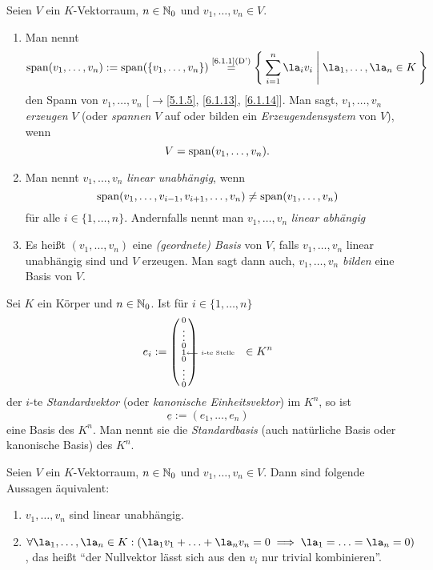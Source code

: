 \documentclass[../../main.tex]{subfiles}
\begin{document}
\begin{df}\label{6.2.1}
Seien $V$ ein $K$-Vektorraum, $n\in\mathbb N_0$ und $v_1,\dots,v_n\in V$.
\begin{enumerate}[\normalfont(a)]
\item Man nennt
$$\lin(v_1,\dots,v_n):=\lin(\{v_1,\dots,v_n\})\overset{\text{\ref{6.1.1}(D')}}=\Set{\sum_{i=1}^n\la_iv_i|\la_1,\dots,\la_n\in K}$$
den Spann von $v_1,\dots,v_n$ [$\to$\ref{5.1.5}, \ref{6.1.13}, \ref{6.1.14}].
Man sagt, $v_1,\dots,v_n$ \emph{erzeugen} $V$ (oder \emph{spannen} $V$ auf oder bilden ein \emph{Erzeugendensystem} von $V$), wenn $$V=\operatorname{span}(v_1,\dots,v_n).$$
\item Man nennt $v_1,\dots,v_n$ \emph{linear unabhängig}, wenn
$$\operatorname{span}(v_1,\dots,v_{i-1},v_{i+1},\dots,v_n)\ne\operatorname{span}(v_1,\dots,v_n)$$
für alle $i\in\{1,\dots,n\}$. Andernfalls nennt man $v_1,\dots,v_n$ \emph{linear abhängig}
\item Es heißt $(v_1,\dots,v_n)$ eine \emph{(geordnete) Basis} von $V$, falls $v_1,\dots,v_n$ linear unabhängig sind und $V$ erzeugen. Man sagt dann auch, $v_1,\dots,v_n$
\emph{bilden} eine Basis von $V$.
\end{enumerate}
\end{df}

\begin{bsp}\label{6.2.2}
Sei $K$ ein Körper und $n\in\mathbb N_0$. Ist für $i\in\{1,\dots,n\}$
$$e_i:=\left(\begin{smallmatrix}0\\\vdots\\0\\1\rlap{\tiny $\longleftarrow$ $i$-te Stelle}\\0\\\vdots\\0\end{smallmatrix}\right)\qquad\qquad\in K^n$$
der $i$-te \emph{Standardvektor} (oder \emph{kanonische Einheitsvektor}) im $K^n$, so ist
$$\underline e:=(e_1,\dots,e_n)$$
eine Basis des $K^n$. Man nennt sie die \emph{Standardbasis} (auch natürliche Basis oder kanonische Basis) des $K^n$.
\end{bsp}

\begin{pro}\label{6.2.3}
Seien $V$ ein $K$-Vektorraum, $n\in\mathbb N_0$ und $v_1,\dots,v_n\in V$. Dann sind folgende Aussagen äquivalent:
\begin{enumerate}[\rm(a)]
\item $v_1,\dots,v_n$ sind linear unabhängig.
\item $\forall\la_1,\dots,\la_n\in K:(\la_1v_1+\ldots+\la_nv_n=0\implies \la_1=\ldots=\la_n=0)$, das heißt "`der Nullvektor lässt sich aus den $v_i$ nur trivial kombinieren"'.
\end{enumerate}
\end{pro}
\end{document}
